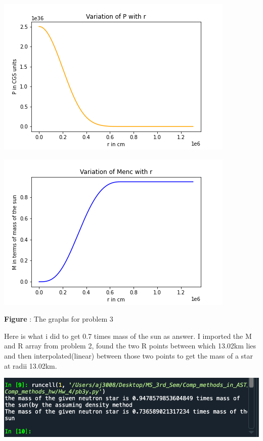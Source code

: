\documentclass{article}
\begin{document}
\begin{itemize}
\emph{\small{}}
\begin{center}
\begin{multicols}{2}
	\begin{center}
        \includegraphics[scale=0.4]{Images/Pr_pb3}
        \end{center}
\columnbreak
	\begin{center}
       \includegraphics[scale=0.4]{Images/Mr_pb3}
       \end{center}
\end{multicols}
\textbf{Figure }: The graphs for problem 3
\end{center}
\vspace{0.2em}

\clearpage
\normalsize{Here is what i did to get 0.7 times mass of the sun as answer. I imported the M and R array from problem 2, found the two R points between which 13.02km lies and then interpolated(linear) between those two points to get the mass of a star at radii 13.02km.}
	\begin{center}
        \includegraphics[scale=0.5]{Images/Output_pb2}
          \vspace{0.2em}
          

\end{center}
\end{itemize}
\end{document}
